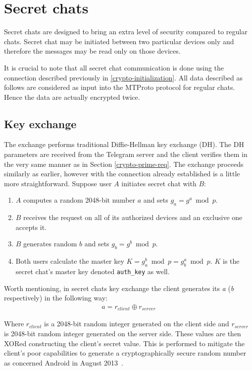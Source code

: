 \documentclass[thesis=M,english]{FITthesis}[2012/10/20]
\begin{document}
\section{Secret chats}\label{crypto-secret}

Secret chats are designed to bring an extra level of security compared to regular chats. Secret chat may be initiated between two particular devices only and therefore the messages may be read only on those devices.

It is crucial to note that all secret chat communication is done using the connection described previously in \ref{crypto-initialization}. All data described as follows are considered as input into the MTProto protocol for regular chats. Hence the data are actually encrypted twice.%

\subsection{Key exchange}\label{crypto-keyexchange}

The exchange performs traditional Diffie-Hellman key exchange (DH). The DH parameters are received from the Telegram server and the client verifies them in the very same manner as in Section \ref{crypto-prime-req}. The exchange proceeds similarly as earlier, however with the connection already established is a little more straightforward. Suppose user $A$ initiates secret chat with $B$:

\begin{enumerate}
	\item $A$ computes a random 2048-bit number $a$ and sets $g_a = g^a \bmod p$.\label{enum:DH-a}
	\item $B$ receives the request on all of its authorized devices and an exclusive one accepts it.
	\item $B$ generates random $b$ and sets $g_b = g^b \bmod p$\label{enum:DH-b}.
	\item Both users calculate the master key $K = g_a^b \bmod p = g_b^a \bmod p$. $K$ is the secret chat's master key denoted \texttt{auth\_key} as well.
\end{enumerate}

Worth mentioning, in secret chats key exchange the client generates its \emph{a} (\emph{b} respectively) in the following way:
\begin{gather*}
a = r_{client} \oplus r_{server}
\end{gather*}

Where $r_{client}$ is a 2048-bit random integer generated on the client side and $r_{server}$ is 2048-bit random integer generated on the server side. These values are then XORed constructing the client's secret value. This is performed to mitigate the client's poor capabilities to generate a cryptographically secure random number as concerned Android in August 2013~\cite{telegram-android-securerandom}.
\end{document}

